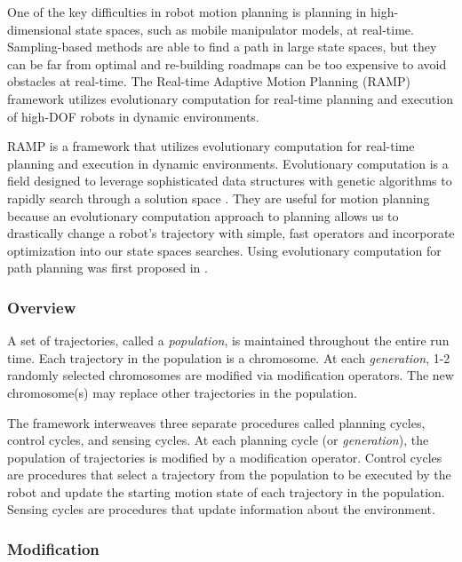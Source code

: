 \documentclass[10pt,conference]{ieeeconf}
\begin{document}
		
One of the key difficulties in robot motion planning is planning in high-dimensional state spaces, such as mobile manipulator models, at real-time. Sampling-based methods are able to find a path in large state spaces, but they can be far from optimal and re-building roadmaps can be too expensive to avoid obstacles at real-time. The Real-time Adaptive Motion Planning (RAMP) \cite{RAMP} framework utilizes evolutionary computation for real-time planning and execution of high-DOF robots in dynamic environments.


RAMP is a framework that utilizes evolutionary computation for real-time planning and execution in dynamic environments. Evolutionary computation is a field designed to leverage sophisticated data structures with genetic algorithms to rapidly search through a solution space \cite{michalewicz2013genetic}. They are useful for motion planning because an evolutionary computation approach to planning allows us to drastically change a robot's trajectory with simple, fast operators and incorporate optimization into our state spaces searches. Using evolutionary computation for path planning was first proposed in \cite{EPN_Adaptive}. 

\subsubsection{Overview}\label{subseq:RAMP Overview}

A set of trajectories, called a \emph{population}, is maintained throughout the entire run time. Each trajectory in the population is a chromosome. At each \emph{generation}, 1-2 randomly selected chromosomes are modified via modification operators. The new chromosome(s) may replace other trajectories in the population. 


The framework interweaves three separate procedures called planning cycles, control cycles, and sensing cycles. At each planning cycle (or \emph{generation}), the population of trajectories is modified by a modification operator. Control cycles are procedures that select a trajectory from the population to be executed by the robot and update the starting motion state of each trajectory in the population. Sensing cycles are procedures that update information about the environment.


\subsubsection{Modification}
\end{document}
